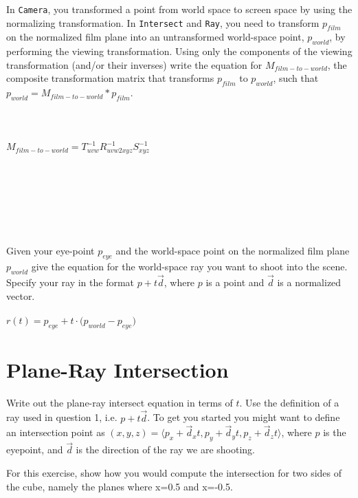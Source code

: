 \documentclass[10pt,twocolumn]{article}
\begin{document}
\begin{framed}
\noindent {\bf [1 point]} In {\tt Camera}, you transformed a point from world space to screen space by using the normalizing transformation. In {\tt Intersect} and {\tt Ray}, you need to transform $p_{film}$ on the normalized film plane into an untransformed world-space point, $p_{world}$, by performing the viewing transformation. Using only the components of the viewing transformation (and/or their inverses) write the equation for $M_{film-to-world}$, the composite transformation matrix that transforms $p_{film}$ to $p_{world}$, such that $p_{world} = M_{film-to-world} * p_{film}$.\\\\\\\\
$M_{film-to-world} = T_{uvw}^{-1}R_{uvw2xyz}^{-1}S_{xyz}^{-1}$\\\\\\\\\\\\\\
\end{framed}

\begin{framed}
\noindent {\bf [1 point]} Given your eye-point $p_{eye}$ and the world-space point on the normalized film plane $p_{world}$ give the equation for the world-space ray you want to shoot into the scene. Specify your ray in the format $p + t\vec{d}$, where $p$ is a point and $\vec{d}$ is a normalized vector. \\\\
$r(t) = p_{eye} + t\cdot \big(p_{world} - p_{eye}\big)$
\end{framed}

\section{Plane-Ray Intersection}

Write out the plane-ray intersect equation in terms of $t$. Use the definition of a ray used in question 1, i.e. $p + t\vec{d}$. To get you started you might want to define
an intersection point as $(x, y, z) = \langle p_x + \vec{d}_xt, p_y + \vec{d}_yt, p_z + \vec{d}_zt\rangle$, where $p$ is the eyepoint, and $\vec{d}$ is the direction of the ray we are shooting. 

For this exercise, show how you would compute the intersection for two sides of the cube, namely the planes where x=0.5 and x=-0.5.
\end{document}
